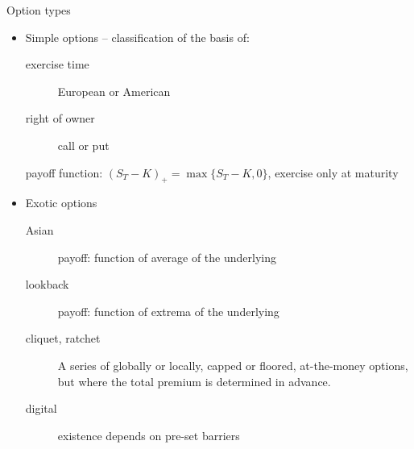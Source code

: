 \documentclass[utf8,t,xcolor=svgnames]{beamer}
\begin{document}
\begin{frame}{Option types}
	\begin{itemize}
		\item Simple options -- classification of the basis of:
		\begin{description}
			\item[exercise time] European or American
			\item[right of owner] call or put
		\end{description}
		\begin{example}
			payoff function: $ (S_T - K)_+ = \max \{S_T - K, 0\} $, exercise only at maturity
		\end{example}
		\item Exotic options
		\begin{description}
			\item[\alert{Asian}] payoff: function of average of the underlying
			\item[lookback] payoff: function of extrema of the underlying
			\item[\alert{cliquet, ratchet}] A series of globally or locally, capped or floored, at-the-money options, but where the total premium is determined in advance.
			\item[digital] existence depends on pre-set barriers
		\end{description}
	\end{itemize}
\end{frame}
\end{document}
